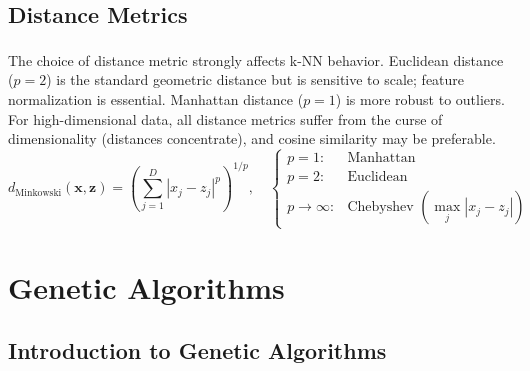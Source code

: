 \subsection{Distance Metrics}

\begin{tcbitemize}[ skin=sectionraster ]
    \tcbitem[title={Euclidean, Manhattan, and Minkowski Distances}, raster multicolumn=6]
    The choice of distance metric strongly affects k-NN behavior\textsuperscript{\cite[][p.397]{hanDataMiningConcepts2012}}. Euclidean distance ($p=2$) is the standard geometric distance but is sensitive to scale; feature normalization is essential. Manhattan distance ($p=1$) is more robust to outliers. For high-dimensional data, all distance metrics suffer from the curse of dimensionality (distances concentrate), and cosine similarity may be preferable.
    \tcblower
    \begin{equation}
        d_{\text{Minkowski}}(\mathbf{x}, \mathbf{z}) = \left(\sum_{j=1}^{D} |x_j - z_j|^p\right)^{1/p},
        \quad
        \begin{cases}
            p = 1: & \text{Manhattan} \\
            p = 2: & \text{Euclidean} \\
            p \to \infty: & \text{Chebyshev } (\max_j |x_j - z_j|)
        \end{cases}
    \end{equation}
\end{tcbitemize}

\section{Genetic Algorithms}

\subsection{Introduction to Genetic Algorithms}

